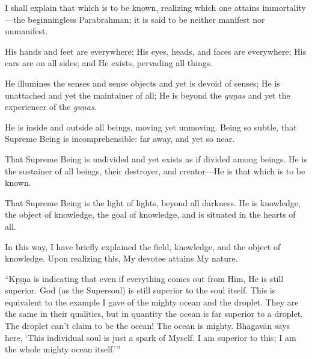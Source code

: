 {I shall explain that which is to be known, realizing which one attains immortality---the beginningless Parabrahman; it is said to be neither manifest nor unmanifest.}

{His hands and feet are everywhere; His eyes, heads, and faces are everywhere; His ears are on all sides; and He exists, pervading all things.}

{He illumines the senses and sense objects and yet is devoid of senses; He is unattached and yet the maintainer of all; He is beyond the \textit{guṇas} and yet the experiencer of the \textit{guṇas}.}

{He is inside and outside all beings, moving yet unmoving. Being so subtle, that Supreme Being is incomprehensible: far away, and yet so near.}

{That Supreme Being is undivided and yet exists as if divided among beings. He is the sustainer of all beings, their destroyer, and creator---He is that which is to be known.}

{That Supreme Being is the light of lights, beyond all darkness. He is knowledge, the object of knowledge, the goal of knowledge, and is situated in the hearts of all.}

{In this way, I have briefly explained the field, knowledge, and the object of knowledge. Upon realizing this, My devotee attains My nature.}

\enquote{Kṛṣṇa is indicating that even if everything comes out from Him, He is still superior. God (as the Supersoul) is still superior to the soul itself. This is equivalent to the example I gave of the mighty ocean and the droplet. They are the same in their qualities, but in quantity the ocean is far superior to a droplet. The droplet can’t claim to be the ocean! The ocean is mighty. Bhagavān says here, \enquote{This individual soul is just a spark of Myself. I am superior to this; I am the whole mighty ocean itself.}}

